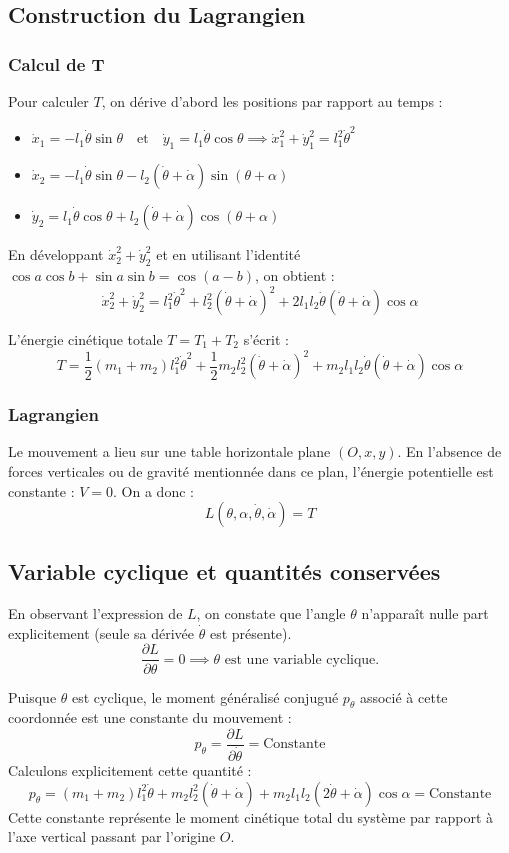 \documentclass[french]{yLectureNote}
\begin{document}
\subsection{Construction du Lagrangien}
\subsubsection{Calcul de T}
Pour calculer $T$, on dérive d'abord les positions par rapport au temps :
\begin{itemize}
    \item $\dot{x}_1 = -l_1\dot{\theta}\sin\theta \quad \text{et} \quad \dot{y}_1 = l_1\dot{\theta}\cos\theta \implies \dot{x}_1^2 + \dot{y}_1^2 = l_1^2\dot{\theta}^2$
    \item $\dot{x}_2 = -l_1\dot{\theta}\sin\theta - l_2(\dot{\theta}+\dot{\alpha})\sin(\theta+\alpha)$
    \item $\dot{y}_2 = l_1\dot{\theta}\cos\theta + l_2(\dot{\theta}+\dot{\alpha})\cos(\theta+\alpha)$
\end{itemize}
En développant $\dot{x}_2^2 + \dot{y}_2^2$ et en utilisant l'identité $\cos a\cos b + \sin a\sin b = \cos(a-b)$, on obtient :
$$\dot{x}_2^2 + \dot{y}_2^2 = l_1^2\dot{\theta}^2 + l_2^2(\dot{\theta}+\dot{\alpha})^2 + 2l_1l_2\dot{\theta}(\dot{\theta}+\dot{\alpha})\cos\alpha$$


L'énergie cinétique totale $T = T_1 + T_2$ s'écrit :
$$T = \frac{1}{2}(m_1+m_2)l_1^2\dot{\theta}^2 + \frac{1}{2}m_2l_2^2(\dot{\theta}+\dot{\alpha})^2 + m_2l_1l_2\dot{\theta}(\dot{\theta}+\dot{\alpha})\cos\alpha$$
\subsubsection{Lagrangien}

Le mouvement a lieu sur une table horizontale plane $(O,x,y)$. En l'absence de forces verticales ou de gravité mentionnée dans ce plan, l'énergie potentielle est constante : $V = 0$. On a donc :
$$L(\theta, \alpha, \dot{\theta}, \dot{\alpha}) = T$$
\subsection{Variable cyclique et quantités conservées}

En observant l'expression de $L$, on constate que l'angle $\theta$ n'apparaît nulle part explicitement (seule sa dérivée $\dot{\theta}$ est présente).
$$\frac{\partial L}{\partial \theta} = 0 \implies \theta \text{ est une variable cyclique.}$$


Puisque $\theta$ est cyclique, le moment généralisé conjugué $p_\theta$ associé à cette coordonnée est une constante du mouvement :
$$p_\theta = \frac{\partial L}{\partial \dot{\theta}} = \text{Constante}$$
Calculons explicitement cette quantité :
$$p_\theta = (m_1+m_2)l_1^2\dot{\theta} + m_2l_2^2(\dot{\theta}+\dot{\alpha}) + m_2l_1l_2(2\dot{\theta}+\dot{\alpha})\cos\alpha = \text{Constante}$$
Cette constante représente le moment cinétique total du système par rapport à l'axe vertical passant par l'origine $O$. 
\end{document}
